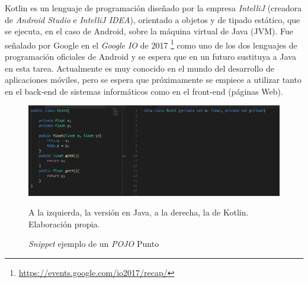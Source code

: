 \documentclass[twoside]{report}
\begin{document}
Kotlin es un lenguaje de programación diseñado por la empresa \textit{IntelliJ} (creadora de \textit{Android Studio} e \textit{IntelliJ IDEA}), orientado a objetos y de tipado estático, que se ejecuta, en el caso de Android, sobre la máquina virtual de Java (JVM). Fue señalado por Google en el \textit{Google IO} de 2017 \footnote{\url{https://events.google.com/io2017/recap/}} como uno de los dos lenguajes de programación oficiales de Android y se espera que en un futuro sustituya a Java en esta tarea. Actualmente es muy conocido en el mundo del desarrollo de aplicaciones móviles, pero se espera que próximamente se empiece a utilizar tanto en el back-end de sistemas informáticos como en el front-end (páginas Web).

\begin{figure}[H]
\centering
\includegraphics[scale=0.6]{images/kotlinexample}\\
\caption{\textit{Snippet} ejemplo de un \textit{POJO} Punto} A la izquierda, la versión en Java, a la derecha, la de Kotlin. Elaboración propia.
\end{figure}
\end{document}

